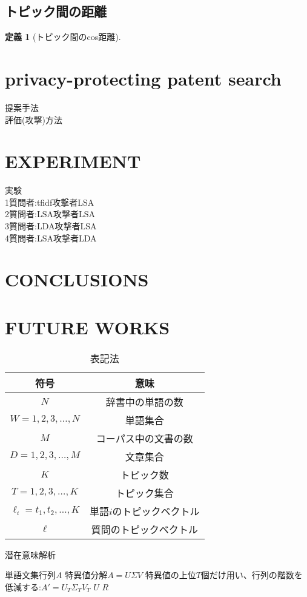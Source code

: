 \documentclass{jsarticle}
\theoremstyle{definition}
\newtheorem{defi}[thm]{定義}
\begin{document}
\subsection{トピック間の距離}

\begin{defi}[トピック間のcos距離]

\end{defi}

\section{privacy-protecting patent search}
提案手法\\
評価(攻撃)方法
\section{EXPERIMENT}
実験\\
1質問者:tfidf攻撃者LSA\\
2質問者:LSA攻撃者LSA\\
3質問者:LDA攻撃者LSA\\
4質問者:LSA攻撃者LDA
\section{CONCLUSIONS}
\section{FUTURE WORKS}

\begin{table}[!hbp]
\center
\begin{tabular}{|c|c|}
\hline
符号 & 意味 \\
\hline
$N$ & 辞書中の単語の数 \\
$W = {1,2,3, \dots ,N} $ & 単語集合 \\
$M$ & コーパス中の文書の数 \\
$D = {1,2,3, \dots ,M}$ & 文章集合 \\ 
$K$ & トピック数 \\
$T = {1,2,3, \dots ,K}$ & トピック集合 \\
$\ell_i = {t_1,t_2,\dots,K} $ & 単語$i$のトピックベクトル \\
$\ell$ & 質問のトピックベクトル \\
\hline
\end{tabular}
\caption{表記法}
\end{table}

\begin{algorithm}
\caption{潜在意味解析}
\begin{algorithmic}[1]
    \Require 単語文集行列$A$
    \State 特異値分解$A = U \Sigma V$
	\State 特異値の上位$T$個だけ用い、行列の階数を低減する:$A' = U_T \Sigma_T V_T$
    \State $U$
    \Return $R$
\end{algorithmic}
\end{algorithm}
\end{document}
